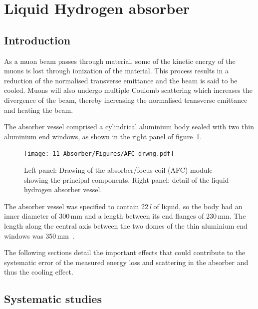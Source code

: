 
\graphicspath{{11-Absorber/Figures/}}

\section{Liquid Hydrogen absorber}
\label{Sect:Absorber}

\subsection{Introduction}
As a muon beam passes through material, some of the kinetic energy
of the muons is lost through ionization of the material.
This process results in a reduction of the normalised
transverse emittance and the beam is said to be cooled.
Muons will also undergo multiple Coulomb scattering which
increases the divergence of the beam, thereby
increasing the normalised transverse emittance and heating the beam.

The absorber vessel comprised a cylindrical aluminium body sealed with
two thin aluminium end windows, as shown in the right panel of
figure~\ref{Fig:AbsorberVessel:Diag}.
\begin{figure}[htb!]
  \begin{center}
    \texttt{[image: 11-Absorber/Figures/AFC-drwng.pdf]}
  \end{center}
  \caption{
    Left panel: Drawing of the absorber/focus-coil (AFC) module showing the principal components. Right panel: detail of the liquid-hydrogen absorber vessel.
  }
  \label{Fig:AbsorberVessel:Diag}
\end{figure}
The absorber vessel was specified to contain 22\,\textit{l} of liquid, so
the body had an inner diameter of 300\,mm and a length between its end
flanges of 230\,mm.  
The length along the central axis between the two domes of the thin aluminium end
windows was 350\,mm~\cite{1748-0221-13-09-T09008}.

The following sections detail the important effects that could contribute to the systematic error of the measured energy loss and scattering in the absorber and thus the cooling effect.


\subsection{Systematic studies}

